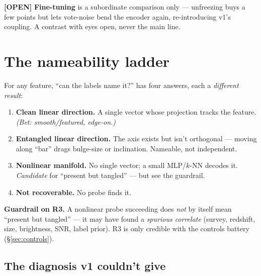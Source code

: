 \documentclass[11pt,a4paper]{article}
\newcommand{\opn}{\textcolor{openq}{\sffamily\bfseries[OPEN]}}
\begin{document}
\opn{} \textbf{Fine-tuning} is a subordinate comparison only --- unfreezing buys a few points
but lets vote-noise bend the encoder again, re-introducing v1's coupling. A contrast with eyes
open, never the main line.

\section{The nameability ladder}\label{sec:ladder}


For any feature, ``can the labels name it?'' has four answers, each a \emph{different result}:

\begin{enumerate}[leftmargin=1.5em,itemsep=2pt]
\item[\textbf{R1}] \textbf{Clean linear direction.} A single vector whose projection tracks the
feature. \emph{(Bet: smooth/featured, edge-on.)}
\item[\textbf{R2}] \textbf{Entangled linear direction.} The axis exists but isn't orthogonal ---
moving along ``bar'' drags bulge-size or inclination. Nameable, not independent.
\item[\textbf{R3}] \textbf{Nonlinear manifold.} No single vector; a small MLP/$k$-NN decodes it.
\emph{Candidate} for ``present but tangled'' --- but see the guardrail.
\item[\textbf{R4}] \textbf{Not recoverable.} No probe finds it.
\end{enumerate}

\begin{openbox}
\textbf{Guardrail on R3.} A nonlinear probe succeeding does \emph{not} by itself mean ``present
but tangled'' --- it may have found a \emph{spurious correlate} (survey, redshift, size,
brightness, SNR, label prior). R3 is only credible with the controls battery
(\S\ref{sec:controls}).
\end{openbox}

\subsection{The diagnosis v1 couldn't give}
\end{document}

